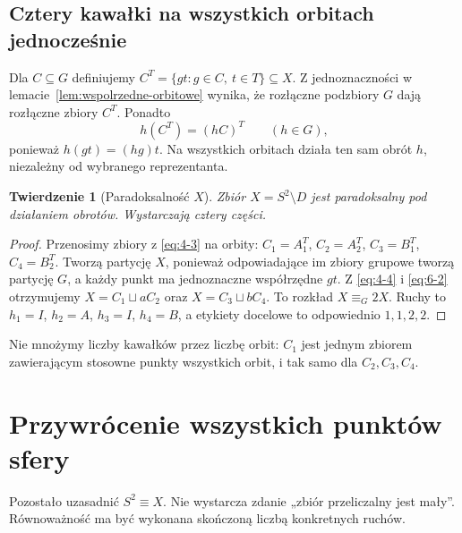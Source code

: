 \documentclass[11pt,a4paper]{article}
\numberwithin{equation}{section}
\theoremstyle{plain}
\newtheorem{twierdzenie}{Twierdzenie}[section]
\theoremstyle{definition}
\theoremstyle{remark}
\newcommand{\equivG}{\mathrel{\equiv_G}}
\begin{document}
\subsection{Cztery kawałki na wszystkich orbitach jednocześnie}
Dla $C\subseteq G$ definiujemy $C^T=\{gt:g\in C,\ t\in T\}\subseteq X$. Z jednoznaczności w lemacie~\ref{lem:wspolrzedne-orbitowe} wynika, że rozłączne podzbiory $G$ dają rozłączne zbiory $C^T$. Ponadto
\begin{equation}\label{eq:6-2}
 h(C^T)=(hC)^T\qquad(h\in G),
\end{equation}
ponieważ $h(gt)=(hg)t$. Na wszystkich orbitach działa ten sam obrót $h$, niezależny od wybranego reprezentanta.
\begin{twierdzenie}[Paradoksalność $X$]\label{tw:paradoksalnosc-x}
Zbiór $X=S^2\setminus D$ jest paradoksalny pod działaniem obrotów. Wystarczają cztery części.
\end{twierdzenie}
\begin{proof}
Przenosimy zbiory z \eqref{eq:4-3} na orbity: $C_1=A_1^T$, $C_2=A_2^T$, $C_3=B_1^T$, $C_4=B_2^T$. Tworzą partycję $X$, ponieważ odpowiadające im zbiory grupowe tworzą partycję $G$, a każdy punkt ma jednoznaczne współrzędne $gt$. Z \eqref{eq:4-4} i \eqref{eq:6-2} otrzymujemy $X=C_1\sqcup aC_2$ oraz $X=C_3\sqcup bC_4$. To rozkład $X\equivG2X$. Ruchy to $h_1=I$, $h_2=A$, $h_3=I$, $h_4=B$, a etykiety docelowe to odpowiednio $1,1,2,2$.
\end{proof}
Nie mnożymy liczby kawałków przez liczbę orbit: $C_1$ jest jednym zbiorem zawierającym stosowne punkty wszystkich orbit, i tak samo dla $C_2,C_3,C_4$.

\section{Przywrócenie wszystkich punktów sfery}
Pozostało uzasadnić $S^2\equiv X$. Nie wystarcza zdanie „zbiór przeliczalny jest mały”. Równoważność ma być wykonana skończoną liczbą konkretnych ruchów.
\end{document}
